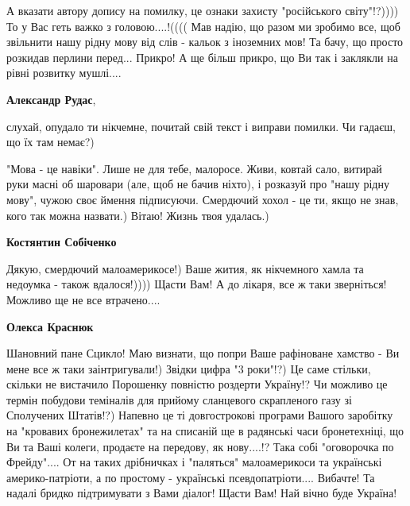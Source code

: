 \begin{itemize}
\begin{itemize}
\obeycr
А вказати автору допису на помилку, це ознаки захисту "російського світу"!?))))
То у Вас геть важко з головою....!((((
Мав надію, що разом ми зробимо все, щоб звільнити нашу рідну мову від слів - кальок з іноземних мов!
Та бачу, що просто розкидав перлини перед...
Прикро!
А ще більш прикро, що Ви так і заклякли на рівні розвитку мушлі....
\restorecr

\textbf{Александр Рудас}, 

слухай, опудало ти нікчемне, почитай свій текст і виправи помилки. Чи гадаєш,
що їх там немає?)

"Мова - це навіки". Лише не для тебе, малоросе. Живи, ковтай сало, витирай руки
масні об шаровари (але, щоб не бачив ніхто), і розказуй про "нашу рідну мову",
чужою своє ймення підписуючи. Смердючий хохол - це ти, якщо не знав, кого так
можна назвати.) Вітаю! Жизнь твоя удалась.)

\textbf{Костянтин Собіченко}

\obeycr
Дякую, смердючий малоамерикосе!)
Ваше жития, як нікчемного хамла та недоумка - також вдалося!))))
Щасти Вам!
А до лікаря, все ж таки зверніться!
Можливо ще не все втрачено....
\restorecr

\textbf{Олекса Краснюк}

\obeycr
Шановний пане Сцикло!
Маю визнати, що попри Ваше рафіноване хамство - Ви мене все ж таки заінтригували!)
Звідки цифра "3 роки"!?)
Це саме стільки, скільки не вистачило Порошенку повністю роздерти Україну!? Чи можливо це термін побудови теміналів для прийому сланцевого скрапленого газу зі Сполучених Штатів!?)
Напевно це ті довгострокові програми Вашого заробітку на "кровавих бронежилетах" та на списаній ще в радянські часи бронетехніці, що Ви та Ваші колеги, продаєте на передову, як нову....!?
Така собі "оговорочка по Фрейду"....
От на таких дрібничках і "паляться" малоамерикоси та українські америко-патріоти, а по простому - українські псевдопатріоти....
Вибачте! Та надалі бридко підтримувати з Вами діалог!
Щасти Вам!
Най вічно буде Україна!
\restorecr

\end{itemize} %

\end{itemize} %
